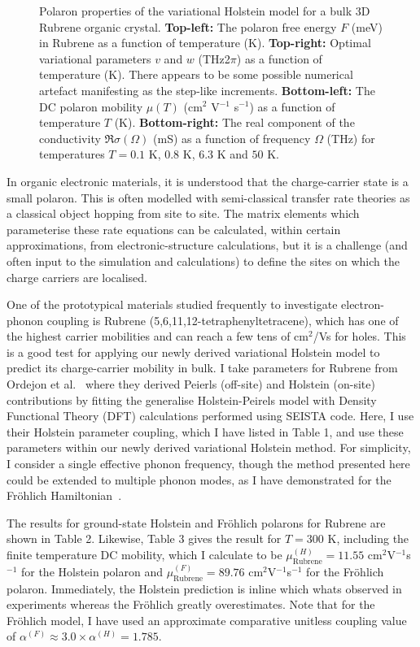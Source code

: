 \begin{figure}[!tbp]
\begin{subfigure}[b]{0.49\textwidth}
  \end{subfigure}
  \caption{Polaron properties of the variational Holstein model for a bulk 3D Rubrene organic crystal. \textbf{Top-left:} The polaron free energy $F$ (meV) in Rubrene as a function of temperature (K). \textbf{Top-right:} Optimal variational parameters $v$ and $w$ (THz2$\pi$) as a function of temperature (K). There appears to be some possible numerical artefact manifesting as the step-like increments. \textbf{Bottom-left:} The DC polaron mobility $\mu(T)$ (cm$^2$ V$^{-1}$ s$^{-1}$) as a function of temperature $T$ (K). \textbf{Bottom-right:} The real component of the conductivity $\Re\sigma(\Omega)$ (mS) as a function of frequency $\Omega$ (THz) for temperatures $T = 0.1$ K, $0.8$ K, $6.3$ K and $50$ K.}
  \label{fig:rubrene}
\end{figure}

In organic electronic materials, it is understood that the charge-carrier state is a small polaron.  This is often modelled with semi-classical transfer rate theories as a classical object hopping from site to site. The matrix elements which parameterise these rate equations can be calculated, within certain approximations, from electronic-structure calculations, but it is a challenge (and often input to the simulation and calculations) to define the sites on which the charge carriers are localised. 

One of the prototypical materials studied frequently to investigate electron-phonon coupling is Rubrene (5,6,11,12-tetraphenyltetracene), which has one of the highest carrier mobilities and can reach a few tens of cm$^2$/Vs for holes. This is a good test for applying our newly derived variational Holstein model to predict its charge-carrier mobility in bulk. I take parameters for Rubrene from Ordejon et al.~\cite{ordejon_ab_2017} where they derived Peierls (off-site) and Holstein (on-site) contributions by fitting the generalise Holstein-Peirels model with Density Functional Theory (DFT) calculations performed using SEISTA code. Here, I use their Holstein parameter coupling, which I have listed in Table 1, and use these parameters within our newly derived variational Holstein method. For simplicity, I consider a single effective phonon frequency, though the method presented here could be extended to multiple phonon modes, as I have demonstrated for the Fr\"ohlich Hamiltonian~\cite{martin_multiple_2023}.

The results for ground-state Holstein and Fr\"ohlich polarons for Rubrene are shown in Table 2. Likewise, Table 3 gives the result for $T = 300$ K, including the finite temperature DC mobility, which I calculate to be $\mu^{(H)}_{\text{Rubrene}} = 11.55$ cm$^2$V$^{-1}$s$^{-1}$ for the Holstein polaron and $\mu^{(F)}_{\text{Rubrene}} = 89.76$ cm$^2$V$^{-1}$s$^{-1}$ for the Fr\"ohlich polaron. Immediately, the Holstein prediction is inline which whats observed in experiments whereas the Fr\"ohlich greatly overestimates. Note that for the Fr\"ohlich model, I have used an approximate comparative unitless coupling value of $\alpha^{(F)} \approx 3.0 \times \alpha^{(H)} = 1.785$.

